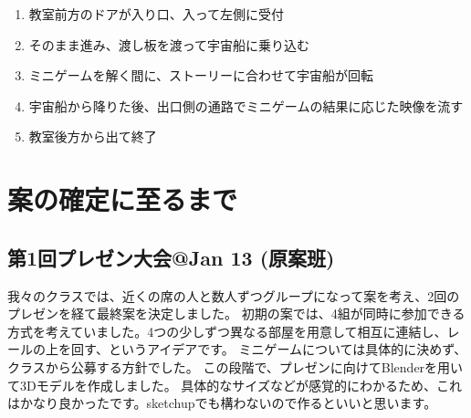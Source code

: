 \documentclass{jsarticle}
\begin{document}
\begin{enumerate}
    \item 教室前方のドアが入り口、入って左側に受付
    \item そのまま進み、渡し板を渡って宇宙船に乗り込む
    \item ミニゲームを解く間に、ストーリーに合わせて宇宙船が回転
    \item 宇宙船から降りた後、出口側の通路でミニゲームの結果に応じた映像を流す
    \item 教室後方から出て終了
\end{enumerate}

\section{案の確定に至るまで}

\subsection{第1回プレゼン大会@Jan 13 (原案班)}

我々のクラスでは、近くの席の人と数人ずつグループになって案を考え、2回のプレゼンを経て最終案を決定しました。
初期の案では、4組が同時に参加できる方式を考えていました。4つの少しずつ異なる部屋を用意して相互に連結し、レールの上を回す、というアイデアです。
ミニゲームについては具体的に決めず、クラスから公募する方針でした。
この段階で、プレゼンに向けてBlenderを用いて3Dモデルを作成しました。
具体的なサイズなどが感覚的にわかるため、これはかなり良かったです。sketchupでも構わないので作るといいと思います。
\end{document}
